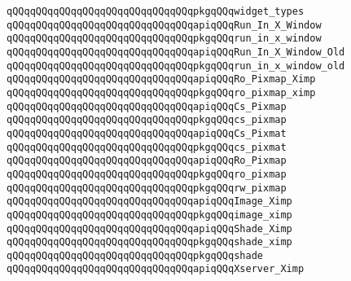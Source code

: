 \newline
\verb|qQQqqQQqqQQqqQQqqQQqqQQqqQQqqQQqpkgqQQqwidget_types|\newline
\newline
\verb|qQQqqQQqqQQqqQQqqQQqqQQqqQQqqQQqapiqQQqRun_In_X_Window|\newline
\verb|qQQqqQQqqQQqqQQqqQQqqQQqqQQqqQQqpkgqQQqrun_in_x_window|\newline
\newline
\verb|qQQqqQQqqQQqqQQqqQQqqQQqqQQqqQQqapiqQQqRun_In_X_Window_Old|\newline
\verb|qQQqqQQqqQQqqQQqqQQqqQQqqQQqqQQqpkgqQQqrun_in_x_window_old|\newline
\newline
\verb|qQQqqQQqqQQqqQQqqQQqqQQqqQQqqQQqapiqQQqRo_Pixmap_Ximp|\newline
\verb|qQQqqQQqqQQqqQQqqQQqqQQqqQQqqQQqpkgqQQqro_pixmap_ximp|\newline
\newline
\verb|qQQqqQQqqQQqqQQqqQQqqQQqqQQqqQQqapiqQQqCs_Pixmap|\newline
\verb|qQQqqQQqqQQqqQQqqQQqqQQqqQQqqQQqpkgqQQqcs_pixmap|\newline
\newline
\verb|qQQqqQQqqQQqqQQqqQQqqQQqqQQqqQQqapiqQQqCs_Pixmat|\newline
\verb|qQQqqQQqqQQqqQQqqQQqqQQqqQQqqQQqpkgqQQqcs_pixmat|\newline
\newline
\verb|qQQqqQQqqQQqqQQqqQQqqQQqqQQqqQQqapiqQQqRo_Pixmap|\newline
\verb|qQQqqQQqqQQqqQQqqQQqqQQqqQQqqQQqpkgqQQqro_pixmap|\newline
\verb|qQQqqQQqqQQqqQQqqQQqqQQqqQQqqQQqpkgqQQqrw_pixmap|\newline
\newline
\verb|qQQqqQQqqQQqqQQqqQQqqQQqqQQqqQQqapiqQQqImage_Ximp|\newline
\verb|qQQqqQQqqQQqqQQqqQQqqQQqqQQqqQQqpkgqQQqimage_ximp|\newline
\newline
\verb|qQQqqQQqqQQqqQQqqQQqqQQqqQQqqQQqapiqQQqShade_Ximp|\newline
\verb|qQQqqQQqqQQqqQQqqQQqqQQqqQQqqQQqpkgqQQqshade_ximp|\newline
\verb|qQQqqQQqqQQqqQQqqQQqqQQqqQQqqQQqpkgqQQqshade|\newline
\newline
\verb|qQQqqQQqqQQqqQQqqQQqqQQqqQQqqQQqapiqQQqXserver_Ximp|\newline
